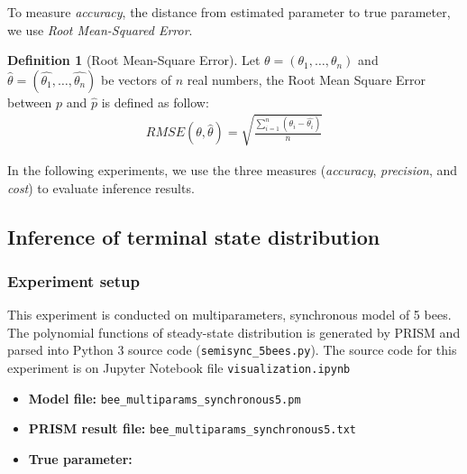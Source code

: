 \documentclass[12pt]{article}
\theoremstyle{definition}
\newtheorem{definition}{Definition}[section]
\begin{document}
To measure \textit{accuracy}, the distance from estimated parameter to true parameter, we use \textit{Root
Mean-Squared Error}.
\begin{definition}[Root Mean-Square Error]
  Let $\theta = (\theta_1,\ldots,\theta_n)$ and $\hat{\theta} =
  (\hat{\theta_1},\ldots,\hat{\theta_n})$ be vectors of $n$ real numbers, the
  Root Mean Square Error between $p$ and $\hat{p}$ is defined as follow:
  \begin{align*}
    RMSE(\theta, \hat{\theta}) = \sqrt{\frac{\sum_{i=1}^n{(\theta_i - \hat{\theta_i})}}{n}}
  \end{align*}

In the following experiments, we use the three measures (\textit{accuracy},
\textit{precision}, and \textit{cost}) to evaluate inference results.
\end{definition}

\subsection{Inference of terminal state distribution}
\subsubsection{Experiment setup}
This experiment is conducted on multiparameters, synchronous model of 5 bees. The polynomial
functions of steady-state distribution is generated by PRISM and parsed into Python 3 source code
(\texttt{semisync\_5bees.py}). The source code for this
experiment is on Jupyter Notebook file \texttt{visualization.ipynb}

\begin{itemize}
\item \textbf{Model file:} \texttt{bee_multiparams_synchronous5.pm}
\item \textbf{PRISM result file:} \texttt{bee_multiparams_synchronous5.txt}
\item \textbf{True parameter:}
  
\end{itemize}
\end{document}
